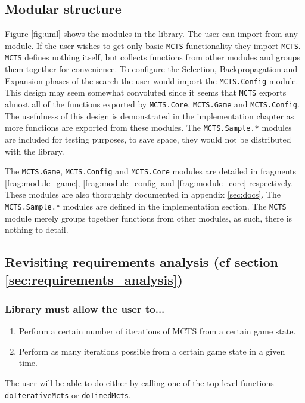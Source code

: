 \subsection{Modular structure}
Figure \ref{fig:uml} shows the modules in the library. The user can import from any module. If the user wishes to get only basic \texttt{MCTS} functionality they import \texttt{MCTS}. \texttt{MCTS} defines nothing itself, but collects functions from other modules and groups them together for convenience. To configure the {Selection}, {Backpropagation} and {Expansion} phases of the search the user would import the \texttt{MCTS.Config} module. This design may seem somewhat convoluted since it seems that \texttt{MCTS} exports almost all of the functions exported by \texttt{MCTS.Core}, \texttt{MCTS.Game} and \texttt{MCTS.Config}. The usefulness of this design is demonstrated in the implementation chapter as more functions are exported from these modules. The \texttt{MCTS.Sample.*} modules are included for testing purposes, to save space, they would not be distributed with the library.


The \texttt{MCTS.Game}, \texttt{MCTS.Config} and \texttt{MCTS.Core} modules are detailed in fragments \ref{frag:module_game}, \ref{frag:module_config} and \ref{frag:module_core} respectively. These modules are also thoroughly documented in appendix \ref{sec:docs}. The \texttt{MCTS.Sample.*} modules are defined in the implementation section. The \texttt{MCTS} module merely groups together functions from other modules, as such, there is nothing to detail.

\subsection{Revisiting requirements analysis (cf section \ref{sec:requirements_analysis})\label{sec:requirements_analysis2}}
\subsubsection{Library must allow the user to...}
\begin{enumerate}
\item Perform a certain number of iterations of {MCTS} from a certain game state.\par
\item Perform as many iterations possible from a certain game state in a given time.\par
\end{enumerate}
The user will be able to do either by calling one of the top level functions \texttt{doIterativeMcts} or \texttt{doTimedMcts}.
